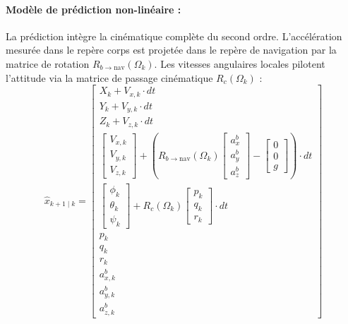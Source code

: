 \documentclass[../Formulations_Kalman.tex]{subfiles}
\begin{document}
\paragraph{Modèle de prédiction non-linéaire :}
La prédiction intègre la cinématique complète du second ordre. L'accélération mesurée dans le repère corps est projetée dans le repère de navigation par la matrice de rotation $R_{b \to \text{nav}}(\Omega_k)$. Les vitesses angulaires locales pilotent l'attitude via la matrice de passage cinématique $R_{c}(\Omega_k)$ :
\begin{equation}
\hat{x}_{k+1\mid k} = \begin{bmatrix} 
X_k + V_{x,k} \cdot dt \\ 
Y_k + V_{y,k} \cdot dt \\ 
Z_k + V_{z,k} \cdot dt \\
\begin{bmatrix} V_{x,k} \\ V_{y,k} \\ V_{z,k} \end{bmatrix} + \left( R_{b \to \text{nav}}(\Omega_k) \begin{bmatrix} a_x^b \\ a_y^b \\ a_z^b \end{bmatrix} - \begin{bmatrix} 0 \\ 0 \\ g \end{bmatrix} \right) \cdot dt \\
\begin{bmatrix} \phi_k \\ \theta_k \\ \psi_k \end{bmatrix} + R_{c}(\Omega_k) \begin{bmatrix} p_k \\ q_k \\ r_k \end{bmatrix} \cdot dt \\
p_k \\ q_k \\ r_k \\
a_{x,k}^b \\ a_{y,k}^b \\ a_{z,k}^b
\end{bmatrix}
\end{equation}
\end{document}
